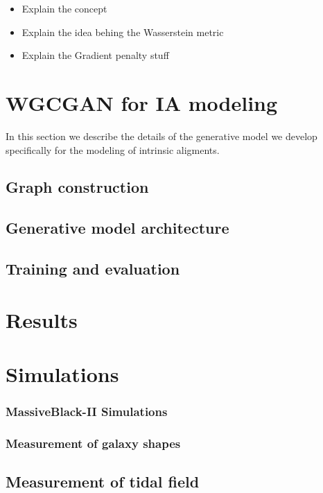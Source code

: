 \documentclass[a4paper,fleqn,usenatbib]{mnras}
\begin{document}
\begin{itemize}
	\item Explain the concept
	\item Explain the idea behing the Wasserstein metric
	\item Explain  the  Gradient penalty stuff
\end{itemize}

\section{WGCGAN for IA modeling}

In this section we describe the details of the generative model we develop specifically for the modeling of 
intrinsic aligments.

\subsection{Graph construction}


\subsection{Generative model architecture}


\subsection{Training and evaluation}


\section{Results}

\section{Simulations}

	\subsubsection{MassiveBlack-II Simulations}

	\subsubsection{Measurement of galaxy  shapes}

	\subsection{Measurement of tidal field}
\end{document}
